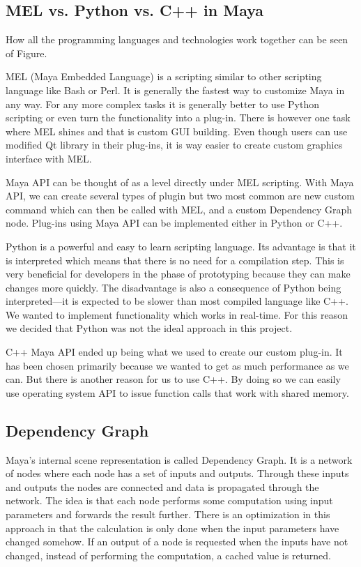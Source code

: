 \documentclass[
  digital, %
  table,   %
  nolof,     %
  nolot,     %
]{fithesis3}
\begin{document}

\subsection{MEL vs. Python vs. C++ in Maya}
How all the programming languages and technologies work together can be seen of Figure.

MEL (Maya Embedded Language) is a scripting similar to other scripting language like Bash or Perl. It is generally the fastest way to customize Maya in any way. For any more complex tasks it is generally better to use Python scripting or even turn the functionality into a plug-in. There is however one task where MEL shines and that is custom GUI building. Even though users can use modified Qt library in their plug-ins, it is way easier to create custom graphics interface with MEL.

Maya API can be thought of as a level directly under MEL scripting. With Maya API, we can create several types of plugin but two most common are new custom command which can then be called with MEL, and a custom Dependency Graph node. Plug-ins using Maya API can be implemented either in Python or C++.

Python is a powerful and easy to learn scripting language. Its advantage is that it is interpreted which means that there is no need for a compilation step. This is very beneficial for developers in the phase of prototyping because they can make changes more quickly. The disadvantage is also a consequence of Python being interpreted—it is expected to be slower than most compiled language like C++. We wanted to implement functionality which works in real-time. For this reason we decided that Python was not the ideal approach in this project.

C++ Maya API ended up being what we used to create our custom plug-in. It has been chosen primarily because we wanted to get as much performance as we can. But there is another reason for us to use C++. By doing so we can easily use operating system API to issue function calls that work with shared memory.

\subsection{Dependency Graph}
Maya's internal scene representation is called Dependency Graph. It is a network of nodes where each node has a set of inputs and outputs. Through these inputs and outputs the nodes are connected and data is propagated through the network. The idea is that each node performs some computation using input parameters and forwards the result further. There is an optimization in this approach in that the calculation is only done when the input parameters have changed somehow. If an output of a node is requested when the inputs have not changed, instead of performing the computation, a cached value is returned.
\end{document}
